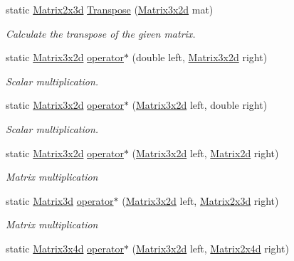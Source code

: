 \begin{DoxyCompactItemize}
static \hyperlink{struct_open_t_k_1_1_matrix2x3d}{Matrix2x3d} \hyperlink{struct_open_t_k_1_1_matrix3x2d_a7acbccc451d0ec58eb41729f65b348de}{Transpose} (\hyperlink{struct_open_t_k_1_1_matrix3x2d}{Matrix3x2d} mat)
\begin{DoxyCompactList}\small\item\em Calculate the transpose of the given matrix. \end{DoxyCompactList}\item 
static \hyperlink{struct_open_t_k_1_1_matrix3x2d}{Matrix3x2d} \hyperlink{struct_open_t_k_1_1_matrix3x2d_a88dffe191fe6670a8a6b63e90f6a2e77}{operator$\ast$} (double left, \hyperlink{struct_open_t_k_1_1_matrix3x2d}{Matrix3x2d} right)
\begin{DoxyCompactList}\small\item\em Scalar multiplication. \end{DoxyCompactList}\item 
static \hyperlink{struct_open_t_k_1_1_matrix3x2d}{Matrix3x2d} \hyperlink{struct_open_t_k_1_1_matrix3x2d_a39880bad12fa318ee0f3ec7ab99f707f}{operator$\ast$} (\hyperlink{struct_open_t_k_1_1_matrix3x2d}{Matrix3x2d} left, double right)
\begin{DoxyCompactList}\small\item\em Scalar multiplication. \end{DoxyCompactList}\item 
static \hyperlink{struct_open_t_k_1_1_matrix3x2d}{Matrix3x2d} \hyperlink{struct_open_t_k_1_1_matrix3x2d_a877b8ceab73b15605fb5a0b44e2431d7}{operator$\ast$} (\hyperlink{struct_open_t_k_1_1_matrix3x2d}{Matrix3x2d} left, \hyperlink{struct_open_t_k_1_1_matrix2d}{Matrix2d} right)
\begin{DoxyCompactList}\small\item\em Matrix multiplication \end{DoxyCompactList}\item 
static \hyperlink{struct_open_t_k_1_1_matrix3d}{Matrix3d} \hyperlink{struct_open_t_k_1_1_matrix3x2d_a052c86545a8ab9d35cfb2ca36de397e7}{operator$\ast$} (\hyperlink{struct_open_t_k_1_1_matrix3x2d}{Matrix3x2d} left, \hyperlink{struct_open_t_k_1_1_matrix2x3d}{Matrix2x3d} right)
\begin{DoxyCompactList}\small\item\em Matrix multiplication \end{DoxyCompactList}\item 
static \hyperlink{struct_open_t_k_1_1_matrix3x4d}{Matrix3x4d} \hyperlink{struct_open_t_k_1_1_matrix3x2d_a4155bffe6cf9564461c21fef20f906e0}{operator$\ast$} (\hyperlink{struct_open_t_k_1_1_matrix3x2d}{Matrix3x2d} left, \hyperlink{struct_open_t_k_1_1_matrix2x4d}{Matrix2x4d} right)

\end{DoxyCompactItemize}
